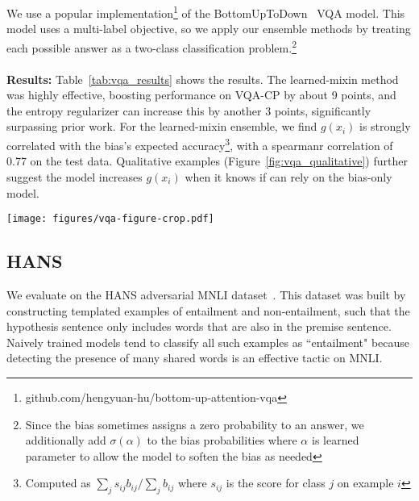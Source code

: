 \documentclass[11pt,a4paper]{article}
\begin{document}
 We use a popular implementation\footnote{github.com/hengyuan-hu/bottom-up-attention-vqa} of the BottomUpToDown~\cite{bottomuptopdown} VQA model. This model uses a multi-label objective, so we apply our ensemble methods by treating each possible answer as a two-class classification problem.\footnote{Since the bias sometimes assigns a zero probability to an answer, we additionally add $\sigma(\alpha)$ to the bias probabilities where $\alpha$ is learned parameter to allow the model to soften the bias as needed}
\\
\\
\textbf{Results:} Table~\ref{tab:vqa_results} shows the results. The learned-mixin method was highly effective, boosting performance on VQA-CP by about 9 points, and the entropy regularizer can increase this by another 3 points, significantly surpassing prior work. 
For the learned-mixin ensemble, we find $g(x_i)$ is strongly correlated with the bias's expected accuracy\footnote{Computed as $\sum_j s_{ij} b_{ij} / \sum_j b_{ij}$ where $s_{ij}$ is the score for class $j$ on example $i$}, with a spearmanr correlation of 0.77 on the test data. Qualitative examples (Figure~\ref{fig:vqa_qualitative}) further suggest the model increases $g(x_i)$ when it knows if can rely on the bias-only model.

\begin{figure*}[t]
    \centering
    \texttt{[image: figures/vqa-figure-crop.pdf]} 
    \caption{Qualitative examples of the values of $g(x_i)$ on the VQA-CP training data for the learned-mixin model (labelled ``G'') and learned-mixin +H model (labelled ``G+''). The question type and the bias model's highest ranked answer for that type are shown above. We find $g(x_i)$ is larger when the bias answers are likely to be correct.}
    \label{fig:vqa_qualitative}
\end{figure*}
\subsection{HANS}
 We evaluate on the HANS adversarial MNLI dataset~\cite{mccoy2019right}. This dataset was built by constructing templated examples of entailment and non-entailment, such that the hypothesis sentence only includes words that are also in the premise sentence. Naively trained models tend to classify all such examples as ``entailment" because detecting the presence of many shared words is an effective tactic on MNLI.
\end{document}
